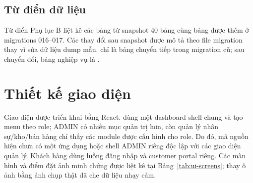 \subsection{Từ điển dữ liệu}
Từ điển Phụ lục B liệt kê các bảng từ snapshot 40 bảng cùng bảng \texttt{} được thêm ở migrations 016--017. Các thay đổi sau snapshot được mô tả theo file migration thay vì sửa dữ liệu dump mẫu. \texttt{} chỉ là bảng chuyển tiếp trong migration cũ; sau chuyển đổi, bảng nghiệp vụ là \texttt{}.

\section{Thiết kế giao diện}
Giao diện được triển khai bằng React. \texttt{} dùng một dashboard shell chung và tạo menu theo role; ADMIN có nhiều mục quản trị hơn, còn quản lý nhân sự/kho/bán hàng chỉ thấy các module được cấu hình cho role. Do đó, mã nguồn hiện chưa có một ứng dụng hoặc shell ADMIN riêng độc lập với các giao diện quản lý. Khách hàng dùng luồng đăng nhập và customer portal riêng. Các màn hình và điểm đặt ảnh minh chứng được liệt kê tại Bảng~\ref{tab:ui-screens}; thay ô ảnh bằng ảnh chụp thật đã che dữ liệu nhạy cảm.

